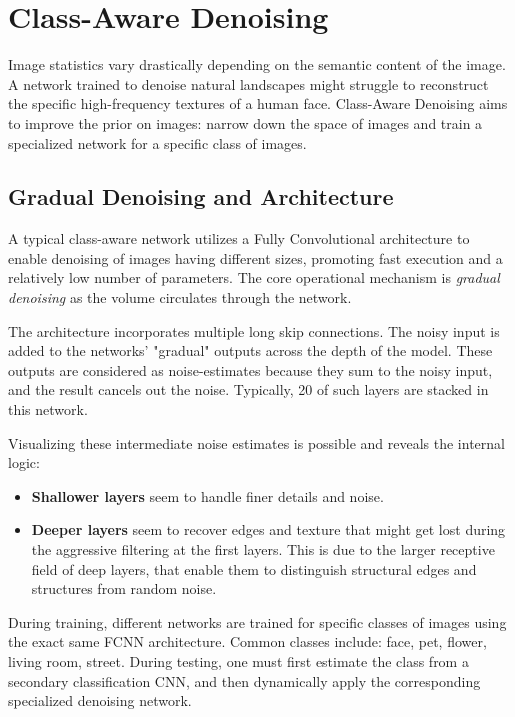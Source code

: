 \section{Class-Aware Denoising}
Image statistics vary drastically depending on the semantic content of the image. A network trained to denoise natural landscapes might struggle to reconstruct the specific high-frequency textures of a human face. Class-Aware Denoising aims to improve the prior on images: narrow down the space of images and train a specialized network for a specific class of images.

\subsection{Gradual Denoising and Architecture}
A typical class-aware network utilizes a Fully Convolutional architecture to enable denoising of images having different sizes, promoting fast execution and a relatively low number of parameters. The core operational mechanism is \textit{gradual denoising} as the volume circulates through the network. 

The architecture incorporates multiple long skip connections. The noisy input is added to the networks' "gradual" outputs across the depth of the model. These outputs are considered as noise-estimates because they sum to the noisy input, and the result cancels out the noise. Typically, 20 of such layers are stacked in this network.

Visualizing these intermediate noise estimates is possible and reveals the internal logic:
\begin{itemize}
    \item \textbf{Shallower layers} seem to handle finer details and noise.
    \item \textbf{Deeper layers} seem to recover edges and texture that might get lost during the aggressive filtering at the first layers. This is due to the larger receptive field of deep layers, that enable them to distinguish structural edges and structures from random noise.
\end{itemize}

During training, different networks are trained for specific classes of images using the exact same FCNN architecture. Common classes include: face, pet, flower, living room, street. During testing, one must first estimate the class from a secondary classification CNN, and then dynamically apply the corresponding specialized denoising network.

